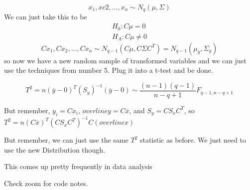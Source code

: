 \[x_1,xc2,...,x_n \sim N_q(\mu,\Sigma)\]
We can just take this to be 
\begin{gather*}
    H_0: C\mu =0 \\
    H_A: C \mu \neq 0
\end{gather*}
\[Cx_1,Cx_2,...,Cx_n \sim N_{q-1}(C\mu,C\Sigma C^T)=N_{q-1}(\mu_y,\Sigma_y)\]
so now we have a new random sample of transformed variables and we can just use the techniques from number 5. Plug it into a t-test and be done.

\[T^2 = n(\overline{y}-0)^T(S_y)^{-1}(\overline{y}-0) \sim \frac{(n-1)(q-1)}{n-q+1}F_{q-1,n-q+1}\]

But remember, $y_i = Cx_i$, $overline{y}=C\overline{x}$, and $S_y = CS_x C^T$, so $T^2 = n(C\overline{x})^T(C S_x C^T)^{-1}C(overline{x})$

But remember, we can just use the same $T^2$ statistic as before. We just need to use the new Distribution though.

This comes up pretty frequently in data analysis

Check zoom for code notes.